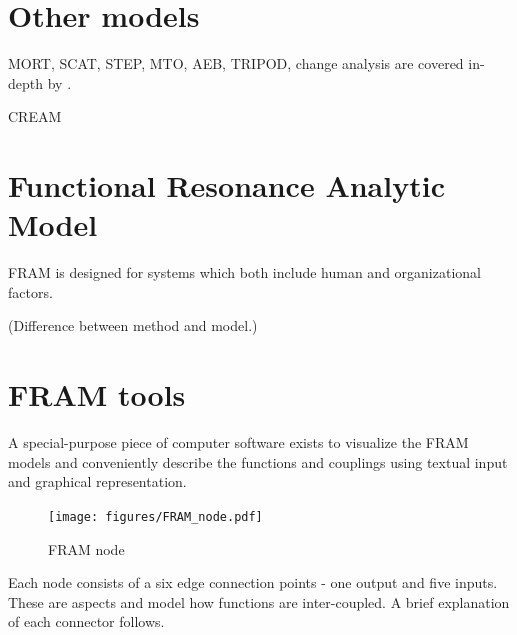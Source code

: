 \section{Other models}
MORT, SCAT, STEP, MTO, AEB, TRIPOD, change analysis are covered in-depth by \cite{Sklet200429}.


CREAM
\section{Functional Resonance Analytic Model}


FRAM is designed for systems which both include human and organizational factors.

(Difference between method and model.)


\section{FRAM tools}
A special-purpose piece of computer software exists to visualize the FRAM models and conveniently describe the functions and couplings using textual input and graphical representation.

\begin{figure}[h]
 \centering
   \texttt{[image: figures/FRAM\_node.pdf]}
 \caption{FRAM node}
 \label{fig:fram_node}
\end{figure}


Each node consists of a six edge connection points - one output and five inputs. These are aspects and model how functions are inter-coupled. A brief explanation of each connector follows.

